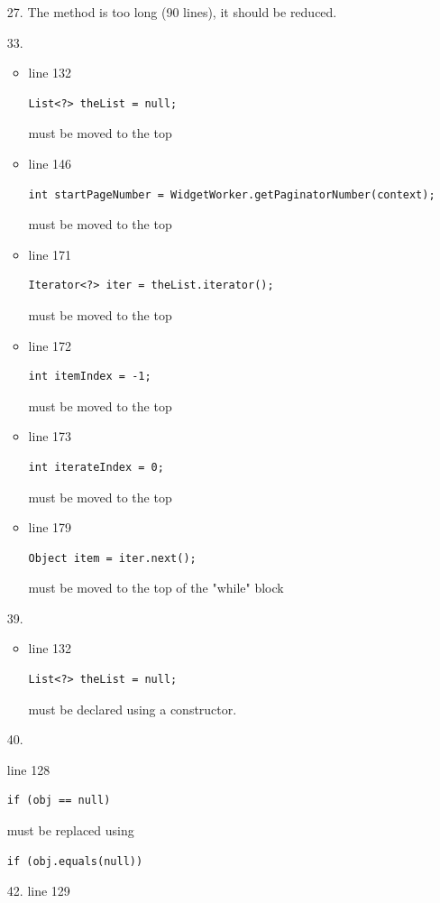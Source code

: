 \documentclass[english]{article}
\begin{document}
\begin{itemize}
	\item[27.]{The method is too long (90 lines), it should be reduced.
}
		\item[33.]{ 
			\begin{itemize}
				\item{line 132
						\begin{lstlisting}
List<?> theList = null;
						\end{lstlisting} must be moved to the top}
				\item{line 146
						\begin{lstlisting}
int startPageNumber = WidgetWorker.getPaginatorNumber(context);
						\end{lstlisting} must be moved to the top}
				\item{line 171
						\begin{lstlisting}
Iterator<?> iter = theList.iterator();
						\end{lstlisting} must be moved to the top}
				\item{line 172
						\begin{lstlisting}
int itemIndex = -1;
						\end{lstlisting} must be moved to the top}
				\item{line 173
						\begin{lstlisting}
int iterateIndex = 0;
						\end{lstlisting} must be moved to the top}
				\item{line 179
						\begin{lstlisting}
Object item = iter.next();
						\end{lstlisting} must be moved to the top of the "while" block}
			\end{itemize}
		}
		\item[39.]{ 
			\begin{itemize}
				\item{line 132
						\begin{lstlisting}
List<?> theList = null;
						\end{lstlisting} must be declared using a constructor.}
			\end{itemize}
}
	\item[40.]{ line 128
		\begin{lstlisting}
if (obj == null)
		\end{lstlisting} must be replaced using
		\begin{lstlisting}
if (obj.equals(null))
		\end{lstlisting}}
	\item[42.]{line 129
}
\end{itemize}
\end{document}
